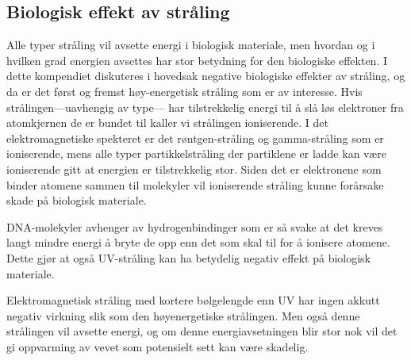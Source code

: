 \documentclass[a4paper,norsk,12pt]{book}
\begin{document}
\subsection{Biologisk effekt av stråling}
Alle typer stråling vil avsette energi i biologisk materiale, men hvordan og i hvilken grad energien avsettes har stor betydning for den biologiske effekten. I dette kompendiet diskuteres i hovedsak negative biologiske effekter av stråling, og da er det først og fremst høy-energetisk stråling som er av interesse. Hvis strålingen---uavhengig av type--- har tilstrekkelig energi til å slå løs elektroner fra atomkjernen de er bundet til kaller vi strålingen ioniserende. I det elektromagnetiske spekteret er det røntgen-stråling og gamma-stråling som er ioniserende, mens alle typer partikkelstråling der partiklene er ladde kan være ioniserende gitt at energien er tilstrekkelig stor. Siden det er elektronene som binder atomene sammen til molekyler vil ioniserende stråling kunne forårsake skade på biologisk materiale. 

DNA-molekyler avhenger av hydrogenbindinger som er så svake at det kreves langt mindre energi å bryte de opp enn det som skal til for å ionisere atomene. Dette gjør at også UV-stråling kan ha betydelig negativ effekt på biologisk materiale.

Elektromagnetisk stråling med kortere bølgelengde enn UV har ingen akkutt negativ virkning slik som den høyenergetiske strålingen. Men også denne strålingen vil avsette energi, og om denne energiavsetningen blir stor nok vil det gi oppvarming av vevet som potensielt sett kan være skadelig. 





\end{document}
